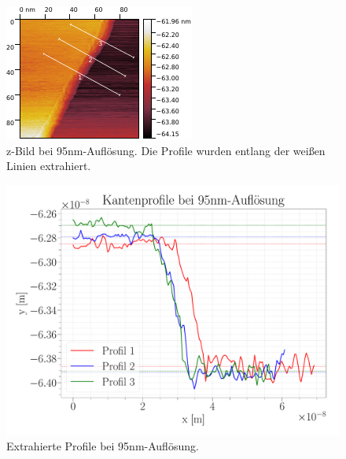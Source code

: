 \begin{figure}[H]
\centering
\includegraphics[width=\textwidth]{../Gwyddion/HOPG/95nm.pdf}
\caption{z-Bild bei {95}{nm}-Auflösung. Die Profile wurden entlang der weißen Linien extrahiert.}
\label{95nm}
\end{figure}

\begin{figure}[H]
\centering
\includegraphics[width=\textwidth]{../Figures/95nm_profiles.pdf}
\caption{Extrahierte Profile bei {95}{nm}-Auflösung.}
\label{95nmProfiles}
\end{figure}

